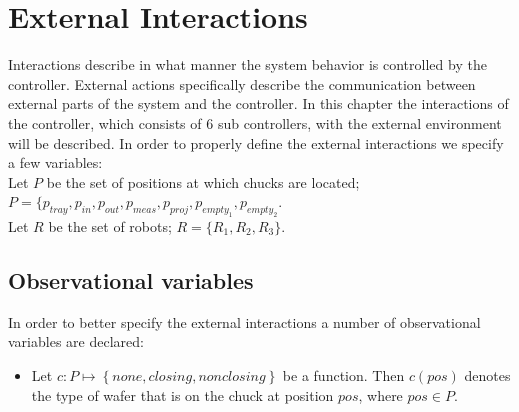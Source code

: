 \section{External Interactions}
Interactions describe in what manner the system behavior is controlled by the controller.
External actions specifically describe the communication between external parts of the system and the controller.
In this chapter the interactions of the controller, which consists of $6$ sub controllers, with the external environment will be described.
In order to properly define the external interactions we specify a few variables:
\\Let $P$ be the set of positions at which chucks are located; $P = \{\mathit{p_\mathit{tray}}, p_\mathit{in}, p_\mathit{out}, p_\mathit{meas}, p_\mathit{proj}, p_{\mathit{empty}_1}, p_{\mathit{empty}_2}$.
\\Let $R$ be the set of robots; $R = \{R_1,R_2,R_3\}$.

\subsection{Observational variables}
In order to better specify the external interactions a number of observational variables are declared:
\begin{itemize}
\item Let $c : P \mapsto \left\{\mathit{none}, \mathit{closing}, \mathit{nonclosing}\right\}$ be a function.
Then $c(\mathit{pos})$ denotes the type of wafer that is on the chuck at position $\mathit{pos}$, where $\mathit{pos} \in P$.
\end{itemize}
